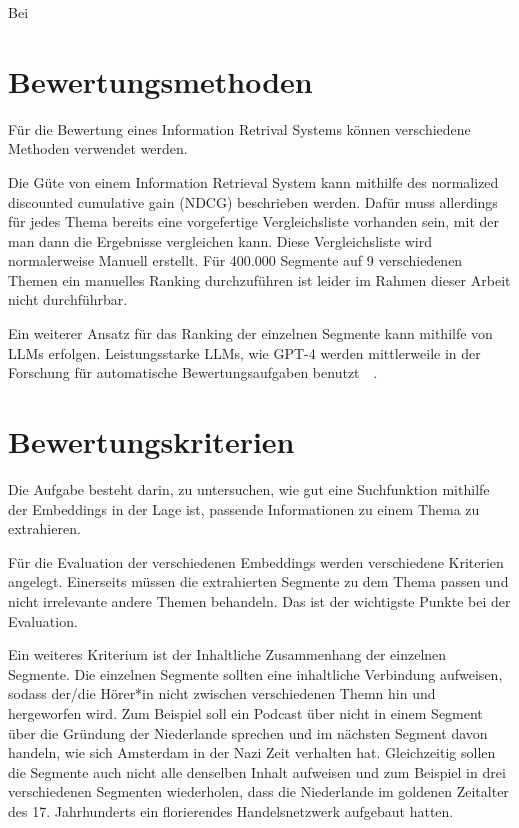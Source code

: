 Bei



\section{Bewertungsmethoden}


Für die Bewertung eines Information Retrival Systems können verschiedene Methoden verwendet werden.


Die Güte von einem Information Retrieval System kann mithilfe des normalized discounted cumulative gain (NDCG) beschrieben werden. 
Dafür muss allerdings für jedes Thema bereits eine vorgefertige Vergleichsliste vorhanden sein, mit der man dann die Ergebnisse vergleichen kann.
Diese Vergleichsliste wird normalerweise Manuell erstellt.
Für 400.000 Segmente auf 9 verschiedenen Themen ein manuelles Ranking durchzuführen ist leider im Rahmen dieser Arbeit nicht durchführbar.

Ein weiterer Ansatz für das Ranking der einzelnen Segmente kann mithilfe von LLMs erfolgen.
Leistungsstarke LLMs, wie GPT-4 werden mittlerweile in der Forschung für automatische Bewertungsaufgaben benutzt~\cite{naismith2023}~\cite{nilsson2023}.



\section{Bewertungskriterien}


Die Aufgabe besteht darin, zu untersuchen, wie gut eine Suchfunktion mithilfe der Embeddings in der Lage ist, passende Informationen zu einem Thema zu extrahieren.

Für die Evaluation der verschiedenen Embeddings werden verschiedene Kriterien angelegt.
Einerseits müssen die extrahierten Segmente zu dem Thema passen und nicht irrelevante andere Themen behandeln.
Das ist der wichtigste Punkte bei der Evaluation.

Ein weiteres Kriterium ist der Inhaltliche Zusammenhang der einzelnen Segmente.
Die einzelnen Segmente sollten eine inhaltliche Verbindung aufweisen, sodass der/die Hörer*in nicht zwischen verschiedenen Themn hin und hergeworfen wird.
Zum Beispiel soll ein Podcast über  nicht in einem Segment über die Gründung der Niederlande sprechen und im nächsten Segment davon handeln, wie sich Amsterdam in der Nazi Zeit verhalten hat.
Gleichzeitig sollen die Segmente auch nicht alle denselben Inhalt aufweisen und zum Beispiel in drei verschiedenen Segmenten wiederholen, dass die Niederlande im goldenen Zeitalter des 17. Jahrhunderts ein florierendes Handelsnetzwerk aufgebaut hatten.
 


